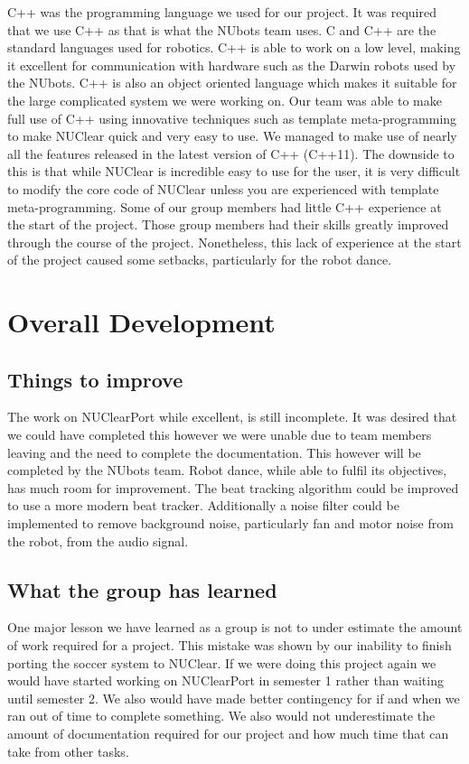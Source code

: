 \documentclass[english,12pt]{scrartcl}
\begin{document}
		C++ was the programming language we used for our project. 
		It was required that we use C++ as that is what the NUbots team uses. 
		C and C++ are the standard languages used for robotics. 
		C++ is able to work on a low level, making it excellent for communication with hardware such as the Darwin robots used by the NUbots.
		C++ is also an object oriented language which makes it suitable for the large complicated system we were working on.
		Our team was able to make full use of C++ using innovative techniques such as template meta-programming to make NUClear quick and very easy to use.
		We managed to make use of nearly all the features released in the latest version of C++ (C++11).
		The downside to this is that while NUClear is incredible easy to use for the user, it is very difficult to modify the core code of NUClear unless you are experienced with template meta-programming.
		Some of our group members had little C++ experience at the start of the project.
		Those group members had their skills greatly improved through the course of the project.
		Nonetheless, this lack of experience at the start of the project caused some setbacks, particularly for the robot dance.
		
\section{Overall Development}
	\subsection{Things to improve}
		The work on NUClearPort while excellent, is still incomplete.
		It was desired that we could have completed this however we were unable due to team members leaving and the need to complete the documentation.
		This however will be completed by the NUbots team.
		Robot dance, while able to fulfil its objectives, has much room for improvement.
		The beat tracking algorithm could be improved to use a more modern beat tracker.
		Additionally a noise filter could be implemented to remove background noise, particularly fan and motor noise from the robot, from the audio signal.
	
	\subsection{What the group has learned}
		One major lesson we have learned as a group is not to under estimate the amount of work required for a project.
		This mistake was shown by our inability to finish porting the soccer system to NUClear.
		If we were doing this project again we would have started working on NUClearPort in semester 1 rather than waiting until semester 2.
		We also would have made better contingency for if and when we ran out of time to complete something.
		We also would not underestimate the amount of documentation required for our project and how much time that can take from other tasks.
\end{document}

